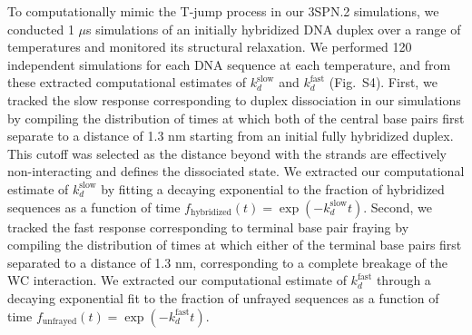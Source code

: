 \documentclass[journal=jpcbfk,manuscript=article]{achemso}
\newcommand*{\blauw}[1]{{#1}}
\begin{document}
To computationally mimic the T-jump process in our 3SPN.2 simulations, we conducted 1 $\mu$s simulations of an initially hybridized DNA duplex over a range of temperatures and monitored its structural relaxation. We performed 120 independent simulations for each DNA sequence at each temperature, and from these extracted computational estimates of $k_d^\mathrm{slow}$ and $k_d^\mathrm{fast}$ (\blauw{Fig.~S4}). First, we tracked the slow response corresponding to duplex dissociation in our simulations by compiling the distribution of times at which both of the central base pairs first separate to a distance of 1.3 nm starting from an initial fully hybridized duplex. This cutoff was selected as the distance beyond with the strands are effectively non-interacting and defines the dissociated state. We extracted our computational estimate of $k_d^\mathrm{slow}$ by fitting a decaying exponential to the fraction of hybridized sequences as a function of time $f_\mathrm{hybridized}(t) = \exp(-k_d^\mathrm{slow}t)$. Second, we tracked the fast response corresponding to terminal base pair fraying by compiling the distribution of times at which either of the terminal base pairs first separated to a distance of 1.3 nm, corresponding to a complete breakage of the WC interaction. We extracted our computational estimate of $k_d^\mathrm{fast}$ through a decaying exponential fit to the fraction of unfrayed sequences as a function of time $f_\mathrm{unfrayed}(t) = \exp(-k_d^\mathrm{fast}t)$. 
\end{document}
